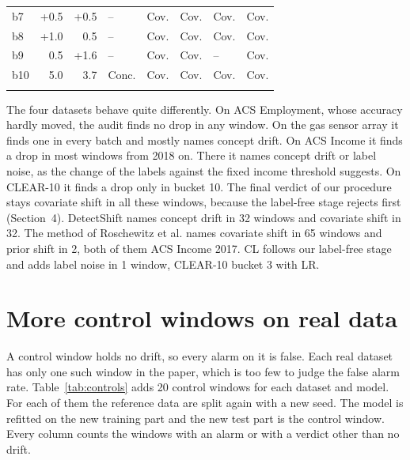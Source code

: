\documentclass[pdflatex,sn-basic]{sn-jnl}
\begin{document}
\begin{table}[!htbp]
\begin{tabular}{@{}lrrlllll@{}}
b7 & +0.5 & +0.5 & -- & Cov. & Cov. & Cov. & Cov. \\
b8 & +1.0 & \textminus{}0.5 & -- & Cov. & Cov. & Cov. & Cov. \\
b9 & \textminus{}0.5 & +1.6 & -- & Cov. & Cov. & -- & Cov. \\
b10 & \textminus{}5.0 & \textminus{}3.7 & Conc. & Cov. & Cov. & Cov. & Cov. \\
\botrule
\end{tabular}
\end{table}

The four datasets behave quite differently. On ACS Employment, whose accuracy hardly moved, the audit finds no drop in any window. On the gas sensor array it finds one in every batch and mostly names concept drift. On ACS Income it finds a drop in most windows from 2018 on. There it names concept drift or label noise, as the change of the labels against the fixed income threshold suggests. On CLEAR-10 it finds a drop only in bucket 10. The final verdict of our procedure stays covariate shift in all these windows, because the label-free stage rejects first (Section~4). DetectShift names concept drift in 32 windows and covariate shift in 32. The method of Roschewitz et al. names covariate shift in 65 windows and prior shift in 2, both of them ACS Income 2017. CL follows our label-free stage and adds label noise in 1 window, CLEAR-10 bucket 3 with LR.

\FloatBarrier

\section{More control windows on real data}\label{sec:controls}

A control window holds no drift, so every alarm on it is false. Each real dataset has only one such window in the paper, which is too few to judge the false alarm rate. Table~\ref{tab:controls} adds 20 control windows for each dataset and model. For each of them the reference data are split again with a new seed. The model is refitted on the new training part and the new test part is the control window. Every column counts the windows with an alarm or with a verdict other than no drift.
\end{document}
